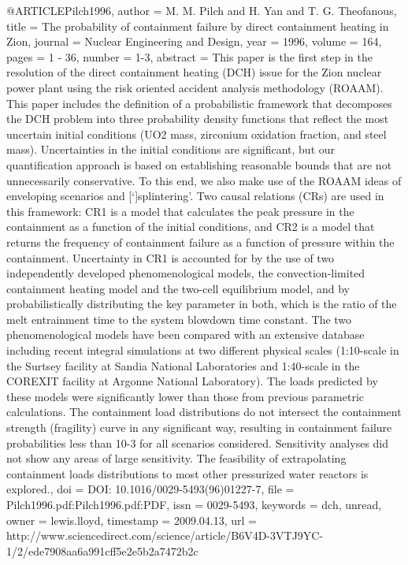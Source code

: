 {{@ARTICLE{Pilch1996,
  author = {M. M. Pilch and H. Yan and T. G. Theofanous},
  title = {The probability of containment failure by direct containment heating
	in Zion},
  journal = {Nuclear Engineering and Design},
  year = {1996},
  volume = {164},
  pages = {1 - 36},
  number = {1-3},
  abstract = {This paper is the first step in the resolution of the direct containment
	heating (DCH) issue for the Zion nuclear power plant using the risk
	oriented accident analysis methodology (ROAAM). This paper includes
	the definition of a probabilistic framework that decomposes the DCH
	problem into three probability density functions that reflect the
	most uncertain initial conditions (UO2 mass, zirconium oxidation
	fraction, and steel mass). Uncertainties in the initial conditions
	are significant, but our quantification approach is based on establishing
	reasonable bounds that are not unnecessarily conservative. To this
	end, we also make use of the ROAAM ideas of enveloping scenarios
	and [`]splintering'. Two causal relations (CRs) are used in this
	framework: CR1 is a model that calculates the peak pressure in the
	containment as a function of the initial conditions, and CR2 is a
	model that returns the frequency of containment failure as a function
	of pressure within the containment. Uncertainty in CR1 is accounted
	for by the use of two independently developed phenomenological models,
	the convection-limited containment heating model and the two-cell
	equilibrium model, and by probabilistically distributing the key
	parameter in both, which is the ratio of the melt entrainment time
	to the system blowdown time constant. The two phenomenological models
	have been compared with an extensive database including recent integral
	simulations at two different physical scales (1:10-scale in the Surtsey
	facility at Sandia National Laboratories and 1:40-scale in the COREXIT
	facility at Argonne National Laboratory). The loads predicted by
	these models were significantly lower than those from previous parametric
	calculations. The containment load distributions do not intersect
	the containment strength (fragility) curve in any significant way,
	resulting in containment failure probabilities less than 10-3 for
	all scenarios considered. Sensitivity analyses did not show any areas
	of large sensitivity. The feasibility of extrapolating containment
	loads distributions to most other pressurized water reactors is explored.},
  doi = {DOI: 10.1016/0029-5493(96)01227-7},
  file = {Pilch1996.pdf:Pilch1996.pdf:PDF},
  issn = {0029-5493},
  keywords = {dch, unread},
  owner = {lewis.lloyd},
  timestamp = {2009.04.13},
  url = {http://www.sciencedirect.com/science/article/B6V4D-3VTJ9YC-1/2/ede7908aa6a991cff5e2e5b2a7472b2c}
}

}}

